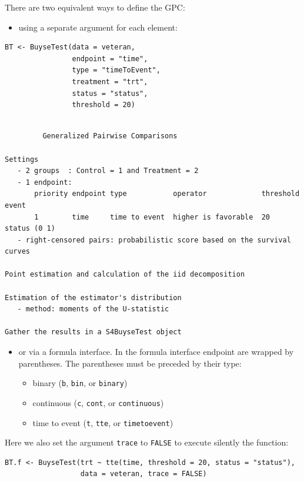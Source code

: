 \documentclass[12pt]{article}
\begin{document}
\bigskip

There are two equivalent ways to define the GPC: 
\begin{itemize}
\item using a separate argument for each element:
\end{itemize}

\lstset{language=r,label= ,caption= ,captionpos=b,numbers=none}
\begin{lstlisting}
BT <- BuyseTest(data = veteran, 
                endpoint = "time", 
                type = "timeToEvent", 
                treatment = "trt", 
                status = "status", 
                threshold = 20)
\end{lstlisting}

\begin{verbatim}

         Generalized Pairwise Comparisons

Settings 
   - 2 groups  : Control = 1 and Treatment = 2
   - 1 endpoint: 
       priority endpoint type           operator             threshold event       
       1        time     time to event  higher is favorable  20        status (0 1)
   - right-censored pairs: probabilistic score based on the survival curves 

Point estimation and calculation of the iid decomposition

Estimation of the estimator's distribution 
   - method: moments of the U-statistic

Gather the results in a S4BuyseTest object
\end{verbatim}

\clearpage

\begin{itemize}
\item or via a formula interface. In the formula interface endpoint are
wrapped by parentheses. The parentheses must be preceded by their
type: 
\begin{itemize}[label={-}]
\item binary (\texttt{b}, \texttt{bin}, or \texttt{binary})
\item continuous (\texttt{c}, \texttt{cont}, or  \texttt{continuous})
\item time to event (\texttt{t}, \texttt{tte}, or \texttt{timetoevent})
\end{itemize}
\end{itemize}
Here we also set the argument \texttt{trace} to \texttt{FALSE} to execute silently
the function:
\lstset{language=r,label= ,caption= ,captionpos=b,numbers=none}
\begin{lstlisting}
BT.f <- BuyseTest(trt ~ tte(time, threshold = 20, status = "status"),
                  data = veteran, trace = FALSE)
\end{lstlisting}
\end{document}
